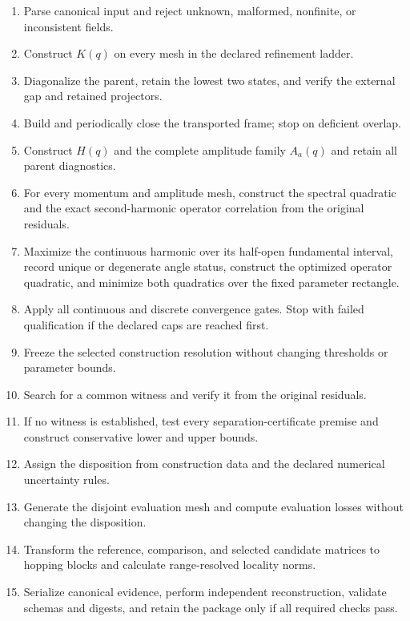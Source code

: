 \documentclass[11pt]{article}
\begin{document}
\begin{enumerate}
  \item Parse canonical input and reject unknown, malformed, nonfinite, or inconsistent
        fields.
  \item Construct $K(q)$ on every mesh in the declared refinement ladder.
  \item Diagonalize the parent, retain the lowest two states, and verify the external
        gap and retained projectors.
  \item Build and periodically close the transported frame; stop on deficient overlap.
  \item Construct $H(q)$ and the complete amplitude family $A_a(q)$ and retain all
        parent diagnostics.
  \item For every momentum and amplitude mesh, construct the spectral quadratic and the
        exact second-harmonic operator correlation from the original residuals.
  \item Maximize the continuous harmonic over its half-open fundamental interval,
        record unique or degenerate angle status, construct the optimized operator
        quadratic, and minimize both quadratics over the fixed parameter rectangle.
  \item Apply all continuous and discrete convergence gates. Stop with failed
        qualification if the declared caps are reached first.
  \item Freeze the selected construction resolution without changing thresholds or
        parameter bounds.
  \item Search for a common witness and verify it from the original residuals.
  \item If no witness is established, test every separation-certificate premise and
        construct conservative lower and upper bounds.
  \item Assign the disposition from construction data and the declared numerical
        uncertainty rules.
  \item Generate the disjoint evaluation mesh and compute evaluation losses without
        changing the disposition.
  \item Transform the reference, comparison, and selected candidate matrices to hopping
        blocks and calculate range-resolved locality norms.
  \item Serialize canonical evidence, perform independent reconstruction, validate
        schemas and digests, and retain the package only if all required checks pass.
\end{enumerate}



\end{document}
